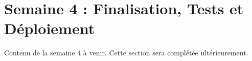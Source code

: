 \chapter{Semaine 4 : Finalisation, Tests et Déploiement}
\thispagestyle{fancy}

Contenu de la semaine 4 à venir. Cette section sera complétée ultérieurement. 